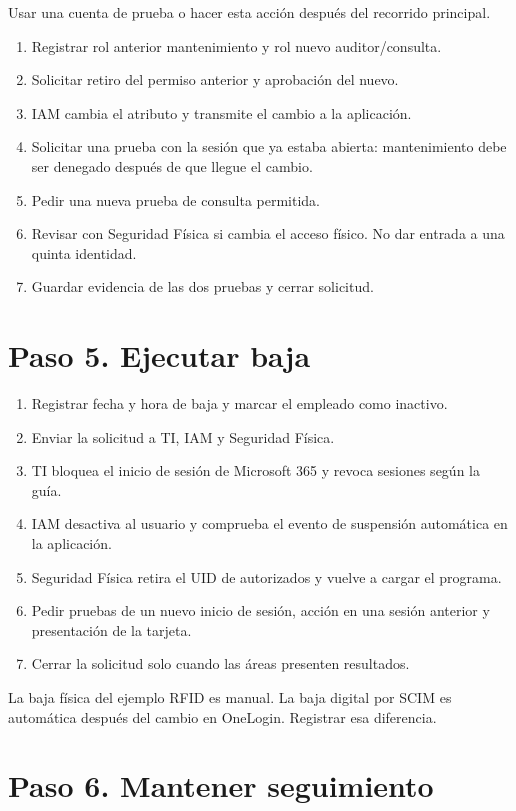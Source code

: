\documentclass[12pt,a4paper]{article}
\begin{document}
Usar una cuenta de prueba o hacer esta acción después del recorrido principal.\par
\begin{enumerate}
\item Registrar rol anterior mantenimiento y rol nuevo auditor/consulta.
\item Solicitar retiro del permiso anterior y aprobación del nuevo.
\item IAM cambia el atributo y transmite el cambio a la aplicación.
\item Solicitar una prueba con la sesión que ya estaba abierta: mantenimiento debe ser denegado después de que llegue el cambio.
\item Pedir una nueva prueba de consulta permitida.
\item Revisar con Seguridad Física si cambia el acceso físico. No dar entrada a una quinta identidad.
\item Guardar evidencia de las dos pruebas y cerrar solicitud.
\end{enumerate}
\section*{Paso 5. Ejecutar baja}
\begin{enumerate}
\item Registrar fecha y hora de baja y marcar el empleado como inactivo.
\item Enviar la solicitud a TI, IAM y Seguridad Física.
\item TI bloquea el inicio de sesión de Microsoft 365 y revoca sesiones según la guía.
\item IAM desactiva al usuario y comprueba el evento de suspensión automática en la aplicación.
\item Seguridad Física retira el UID de autorizados y vuelve a cargar el programa.
\item Pedir pruebas de un nuevo inicio de sesión, acción en una sesión anterior y presentación de la tarjeta.
\item Cerrar la solicitud solo cuando las áreas presenten resultados.
\end{enumerate}
La baja física del ejemplo RFID es manual. La baja digital por SCIM es automática después del cambio en OneLogin. Registrar esa diferencia.\par
{}\section*{Paso 6. Mantener seguimiento}
\end{document}
